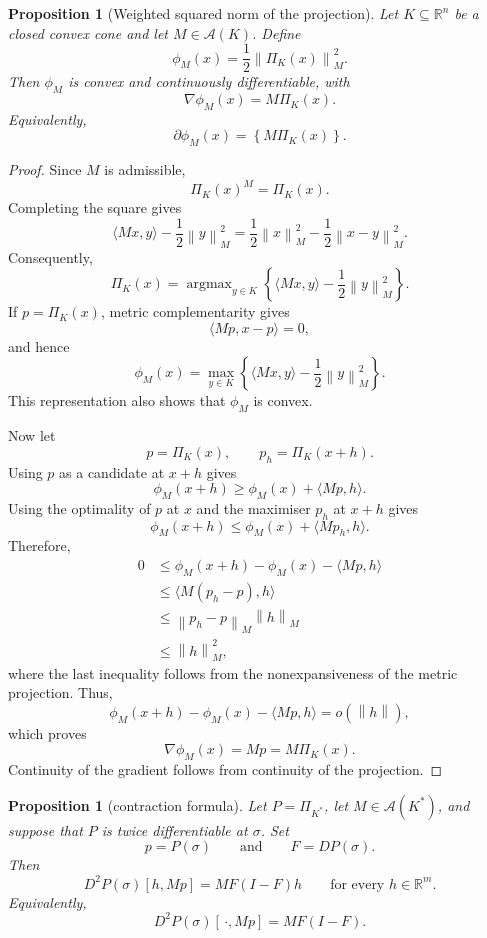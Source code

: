 \documentclass[a4paper,11pt]{book}
\theoremstyle{plain}
\newtheorem{proposition}[theorem]{Proposition}
\theoremstyle{definition}
\theoremstyle{remark}
\numberwithin{equation}{chapter}
\numberwithin{algorithm}{chapter}
\newcommand{\R}{\mathbb{R}}
\newcommand{\proj}[2]{\Pi_{#2}\!\left(#1\right)}
\newcommand{\norm}[1]{\left\|#1\right\|}
\DeclareMathOperator*{\argmax}{argmax}
\begin{document}
	\begin{proposition}[Weighted squared norm of the projection]
		Let $K\subseteq\mathbb R^n$ be a closed convex cone and let
		$M\in\mathcal A(K)$. Define
		\[
		\phi_M(x)
		=
		\frac12\norm{\proj{x}{K}}_M^2.
		\]
		Then $\phi_M$ is convex and continuously differentiable, with
		\[
		\nabla\phi_M(x)=M\proj{x}{K}.
		\]
		Equivalently,
		\[
		\partial\phi_M(x)
		=
		\left\{M\proj{x}{K}\right\}.
		\]
	\end{proposition}
	
	\begin{proof}
		Since $M$ is admissible,
		\[
		\proj{x}{K}^{M}=\proj{x}{K}.
		\]
		Completing the square gives
		\[
		\langle Mx,y\rangle-\frac12\norm{y}_M^2
		=
		\frac12\norm{x}_M^2-\frac12\norm{x-y}_M^2.
		\]
		Consequently,
		\[
		\proj{x}{K}
		=
		\argmax_{y\in K}
		\left\{
		\langle Mx,y\rangle-\frac12\norm{y}_M^2
		\right\}.
		\]
		If $p=\proj{x}{K}$, metric complementarity gives
		\[
		\langle Mp,x-p\rangle=0,
		\]
		and hence
		\[
		\phi_M(x)
		=
		\max_{y\in K}
		\left\{
		\langle Mx,y\rangle-\frac12\norm{y}_M^2
		\right\}.
		\]
		This representation also shows that $\phi_M$ is convex.
		
		Now let
		\[
		p=\proj{x}{K},
		\qquad
		p_h=\proj{x+h}{K}.
		\]
		Using $p$ as a candidate at $x+h$ gives
		\[
		\phi_M(x+h)
		\geq
		\phi_M(x)+\langle Mp,h\rangle.
		\]
		Using the optimality of $p$ at $x$ and the maximiser $p_h$ at $x+h$ gives
		\[
		\phi_M(x+h)
		\leq
		\phi_M(x)+\langle Mp_h,h\rangle.
		\]
		Therefore,
		\[
		\begin{aligned}
			0
			&\leq
			\phi_M(x+h)-\phi_M(x)-\langle Mp,h\rangle\\
			&\leq
			\langle M(p_h-p),h\rangle\\
			&\leq
			\norm{p_h-p}_M\norm{h}_M\\
			&\leq
			\norm{h}_M^2,
		\end{aligned}
		\]
		where the last inequality follows from the nonexpansiveness of the metric
		projection. Thus,
		\[
		\phi_M(x+h)-\phi_M(x)-\langle Mp,h\rangle
		=
		o(\norm{h}),
		\]
		which proves
		\[
		\nabla\phi_M(x)=Mp=M\proj{x}{K}.
		\]
		Continuity of the gradient follows from continuity of the projection.
	\end{proof}
	\begin{proposition}[contraction formula]
		Let \(P=\Pi_{K^*}\), let \(M\in\mathcal A(K^*)\), and suppose that \(P\) is
		twice differentiable at \(\sigma\). Set
		\[
		p=P(\sigma)
		\qquad\text{and}\qquad
		F=DP(\sigma).
		\]
		Then
		\begin{equation}
			D^2P(\sigma)[h,Mp]
			=
			MF(I-F)h
			\qquad
			\text{for every }h\in\R^m.
		\end{equation}
		Equivalently,
		\begin{equation}
			D^2P(\sigma)[\,\cdot,Mp]
			=
			MF(I-F).
		\end{equation}
	\end{proposition}
	
\end{document}
